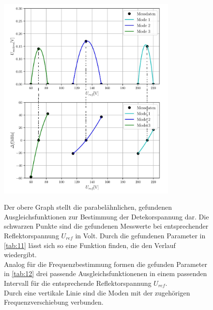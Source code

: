 \begin{figure}
    \centering
    \includegraphics[width=0.8\textwidth]{Bilder/SO.jpg}
    \label{fig:123}
    \caption{Der obere Graph stellt die parabelähnlichen, gefundenen Ausgleichsfunktionen zur Bestimmung der Detekorspannung dar. Die schwarzen
            Punkte sind die gefundenen Messwerte bei entsprechender Reflektorspannung $U_{ref}$ in Volt. Durch die gefundenen Parameter in \ref{tab:11}
            lässt sich so eine Funktion finden, die den Verlauf wiedergibt.    \\
            Analog für die Frequenzbestimmung formen die gefunden Parameter in \ref{tab:12} drei passende Ausgleichsfunktionenen in einem passenden 
            Intervall für die entsprechende Reflektorspannung $U_{ref}$. \\
            Durch eine vertikale Linie sind die Moden mit der zugehörigen Frequenzverschiebung verbunden.} 
    \label{fig:gimp}
\end{figure}

